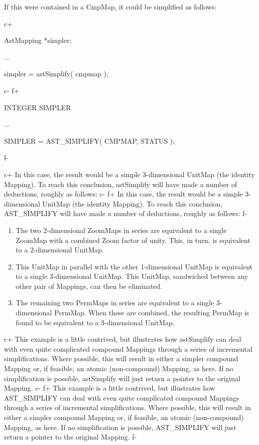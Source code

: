 \documentclass[twoside,11pt]{starlink}
\begin{document}
If this were contained in a CmpMap, it could be simplified as follows:

c+
\small
\begin{terminalv}
AstMapping *simpler;

...

simpler = astSimplify( cmpmap );
\end{terminalv}
\normalsize
c-
f+
\small
\begin{terminalv}
      INTEGER SIMPLER

      ...

      SIMPLER = AST_SIMPLIFY( CMPMAP, STATUS );
\end{terminalv}
\normalsize
f-

c+
In this case, the result would be a simple 3-dimensional UnitMap (the
identity Mapping).  To reach this conclusion, astSimplify will have
made a number of deductions, roughly as follows:
c-
f+
In this case, the result would be a simple 3-dimensional UnitMap (the
identity Mapping).  To reach this conclusion, AST\_SIMPLIFY will have
made a number of deductions, roughly as follows:
f-

\begin{enumerate}
\item The two 2-dimensional ZoomMaps in series are equivalent to a
single ZoomMap with a combined Zoom factor of unity. This, in turn, is
equivalent to a 2-dimensional UnitMap.

\item This UnitMap in parallel with the other 1-dimensional UnitMap is
equivalent to a single 3-dimensional UnitMap. This UnitMap, sandwiched
between any other pair of Mappings, can then be eliminated.

\item The remaining two PermMaps in series are equivalent to a single
3-dimensional PermMap. When these are combined, the resulting PermMap
is found to be equivalent to a 3-dimensional UnitMap.
\end{enumerate}

c+
This example is a little contrived, but illustrates how astSimplify
can deal with even quite complicated compound Mappings through a
series of incremental simplifications. Where possible, this will
result in either a simpler compound Mapping or, if feasible, an atomic
(non-compound) Mapping, as here. If no simplification is possible,
astSimplify will just return a pointer to the original Mapping.
c-
f+
This example is a little contrived, but illustrates how AST\_SIMPLIFY
can deal with even quite complicated compound Mappings through a
series of incremental simplifications. Where possible, this will
result in either a simpler compound Mapping or, if feasible, an atomic
(non-compound) Mapping, as here. If no simplification is possible,
AST\_SIMPLIFY will just return a pointer to the original Mapping.
f-
\end{document}

